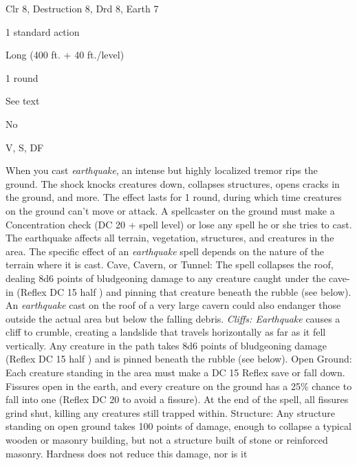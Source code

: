
\begin{description*}
\item[Level:] Clr 8, Destruction 8, Drd 8, Earth 7
\item[Casting Time:] 1 standard action
\item[Range:] Long (400 ft. + 40 ft./level)
\item[Duration:] 1 round
\item[Saving Throw:] See text
\item[Spell Resistance:] No
\item[Components:] V, S, DF
\end{description*}

When you cast \textit{earthquake}, an intense but highly localized tremor rips
the ground. The shock knocks creatures down, collapses structures, opens cracks
in the ground, and more. The effect lasts for 1 round, during which time creatures
on the ground can't move or attack. A spellcaster on the ground must make a Concentration
check (DC 20 + spell level) or lose any spell he or she tries to cast. The earthquake
affects all terrain, vegetation, structures, and creatures in the area. The specific
effect of an \textit{earthquake} spell depends on the nature of the terrain where
it is cast.
Cave, Cavern, or Tunnel: The spell collapses the roof, dealing 8d6 points
of bludgeoning damage to any creature caught under the cave-in (Reflex DC 15 half
) and pinning that creature beneath the rubble (see below). An \textit{earthquake
}cast on the roof of a very large cavern could also endanger those outside the
actual area but below the falling debris.
\textit{Cliffs: Earthquake} causes a cliff to crumble, creating a landslide that
travels horizontally as far as it fell vertically. Any creature in the path takes
8d6 points of bludgeoning damage (Reflex DC 15 half ) and is pinned beneath the
rubble (see below).
Open Ground: Each creature standing in the area must make a DC 15 Reflex
save or fall down. Fissures open in the earth, and every creature on the ground
has a 25\% chance to fall into one (Reflex DC 20 to avoid a fissure). At the end
of the spell, all fissures grind shut, killing any creatures still trapped within.
Structure: Any structure standing on open ground takes 100 points of damage,
enough to collapse a typical wooden or masonry building, but not a structure built
of stone or reinforced masonry. Hardness does not reduce this damage, nor is it
